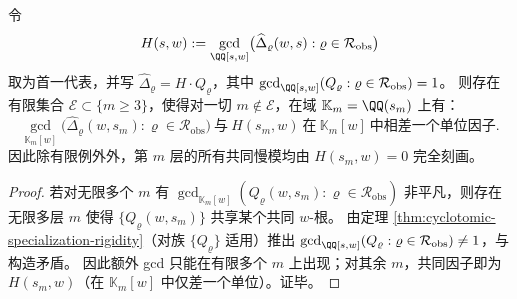 \begin{theorem}\label{thm:cyclotomic-gcd-stability}
令
\[
H(s,w):=\gcd_{\QQ[s,w]}\bigl(\widehat{\Delta}_{\varrho}(w,s):\varrho\in\mathcal{R}_{\mathrm{obs}}\bigr)
\]
取为首一代表，并写 \(\widehat{\Delta}_{\varrho}=H\cdot Q_{\varrho}\)，其中
\(
\gcd_{\QQ[s,w]}(Q_{\varrho}:\varrho\in\mathcal{R}_{\mathrm{obs}})=1
\)。
则存在有限集合 \(\mathcal{E}\subset\{m\ge 3\}\)，使得对一切 \(m\notin\mathcal{E}\)，在域 \(\mathbb{K}_m=\QQ(s_m)\) 上有：
\[
\gcd_{\mathbb{K}_m[w]}\bigl(\widehat{\Delta}_{\varrho}(w,s_m):\varrho\in\mathcal{R}_{\mathrm{obs}}\bigr)
\ \text{与}\ H(s_m,w)\ \text{在}\ \mathbb{K}_m[w]\ \text{中相差一个单位因子}.
\]
因此除有限例外外，第 \(m\) 层的所有共同慢模均由 \(H(s_m,w)=0\) 完全刻画。
\end{theorem}
\begin{proof}
若对无限多个 \(m\) 有
\(
\gcd_{\mathbb{K}_m[w]}(Q_{\varrho}(w,s_m):\varrho\in\mathcal{R}_{\mathrm{obs}})
\)
非平凡，则存在无限多层 \(m\) 使得 \(\{Q_{\varrho}(w,s_m)\}\) 共享某个共同 \(w\)-根。
由定理 \ref{thm:cyclotomic-specialization-rigidity}（对族 \(\{Q_{\varrho}\}\) 适用）推出
\(
\gcd_{\QQ[s,w]}(Q_{\varrho}:\varrho\in\mathcal{R}_{\mathrm{obs}})\neq 1
\)，与构造矛盾。
因此额外 gcd 只能在有限多个 \(m\) 上出现；对其余 \(m\)，共同因子即为 \(H(s_m,w)\)（在 \(\mathbb{K}_m[w]\) 中仅差一个单位）。证毕。
\end{proof}

